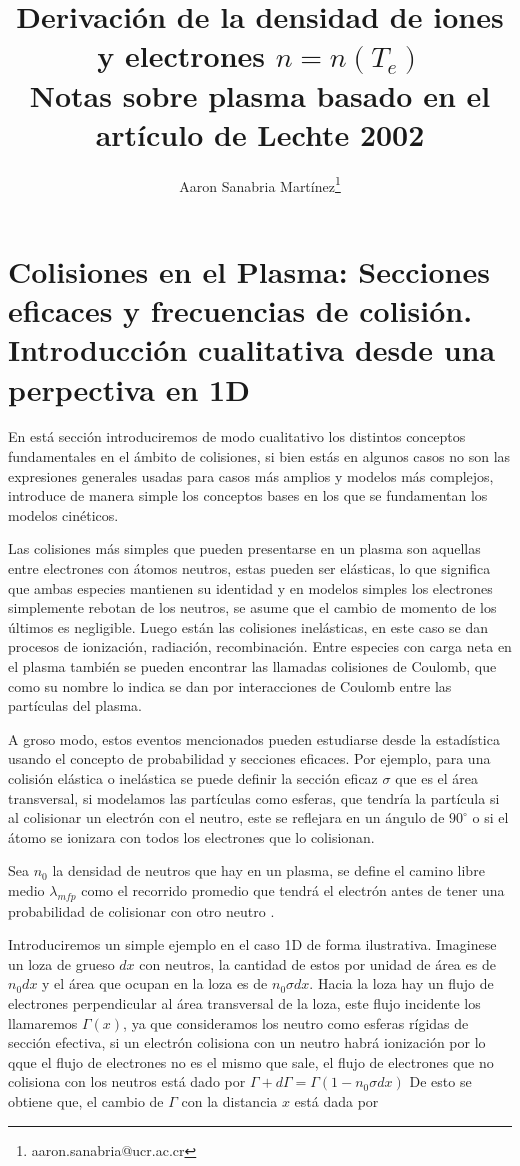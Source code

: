 \documentclass[11pt]{article}
\title{Derivaci\'on de la densidad de iones y electrones $n = n(T_e)$ \\ \small{Notas sobre plasma basado en el art\'iculo de Lechte 2002} \cite{lechte2002}}
\author{Aaron Sanabria Mart\'inez\footnote{aaron.sanabria@ucr.ac.cr}}
\theoremstyle{definition}
\begin{document}
  \maketitle
	\thispagestyle{empty}

  \section{Colisiones en el Plasma: Secciones eficaces y frecuencias de colisi\'on. Introducci\'on cualitativa desde una perpectiva en 1D}

  En est\'a secci\'on introduciremos de modo cualitativo los distintos conceptos fundamentales en el \'ambito de colisiones, si bien est\'as en algunos casos no son las expresiones generales usadas para casos m\'as amplios y modelos m\'as complejos, introduce de manera simple los conceptos bases en los que se fundamentan los modelos cin\'eticos. 

  Las colisiones m\'as simples que pueden presentarse en un plasma son aquellas entre electrones con \'atomos neutros, estas pueden ser el\'asticas, lo que significa que ambas especies mantienen su identidad y en modelos simples los electrones simplemente rebotan de los neutros, se asume que el cambio de momento de los \'ultimos es negligible. Luego est\'an las colisiones inel\'asticas, en este caso se dan procesos de ionizaci\'on, radiaci\'on, recombinaci\'on. Entre especies con carga neta en el plasma tambi\'en se pueden encontrar las llamadas colisiones de Coulomb, que como su nombre lo indica se dan por interacciones de Coulomb entre las part\'iculas del plasma. 

  A groso modo, estos eventos mencionados pueden estudiarse desde la estad\'istica usando el concepto de probabilidad y secciones eficaces. Por ejemplo, para una colisi\'on el\'astica o inel\'astica se puede definir la secci\'on eficaz $\sigma$ que es el \'area transversal, si modelamos las part\'iculas como esferas, que tendr\'ia la part\'icula si al colisionar un electr\'on con el neutro, este se reflejara en un \'angulo de $90^\circ$ o si el \'atomo se ionizara con todos los electrones que lo colisionan.

    Sea $n_0$ la densidad de neutros que hay en un plasma, se define el camino libre medio $\lambda_{mfp}$ como el recorrido promedio que tendr\'a el electr\'on antes de tener una probabilidad de colisionar con otro neutro \cite{goldston1995}. 

    Introduciremos un simple ejemplo en el caso 1D de forma ilustrativa. Imaginese un loza de grueso $dx$ con neutros, la cantidad de estos por unidad de \'area es de $n_0dx$ y el \'area que ocupan en la loza es de $n_0 \sigma dx$. Hacia la loza hay un flujo de electrones perpendicular al \'area transversal de la loza, este flujo incidente los llamaremos $\Gamma(x)$, ya que consideramos los neutro como esferas rígidas de secci\'on efectiva, si un electr\'on colisiona con un neutro habr\'a ionizaci\'on por lo qque el flujo de electrones no es el mismo que sale, el flujo de electrones que no colisiona con los neutros est\'a dado por $\Gamma + d\Gamma = \Gamma(1 - n_0\sigma dx)$ De esto se obtiene que, el cambio de $\Gamma$ con la distancia $x$ est\'a dada por 
\end{document}

